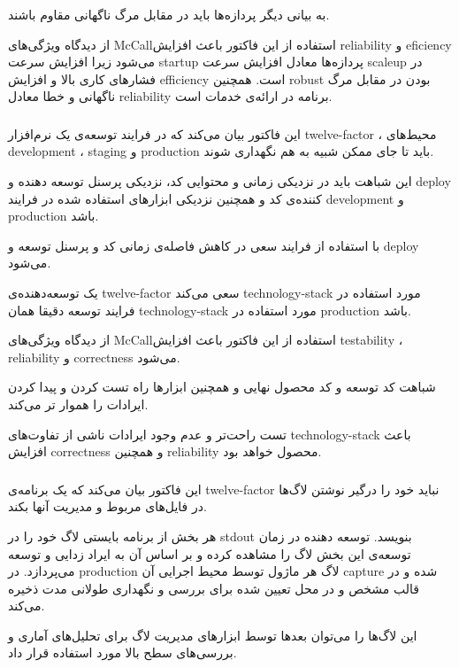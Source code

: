 به بیانی دیگر پردازه‌ها باید در مقابل مرگ ناگهانی مقاوم باشند.

از دیدگاه ویژگی‌های McCallاستفاده از این فاکتور باعث افزایش reliability و eficiency می‌شود زیرا افزایش سرعت startup پردازه‌ها معادل افزایش سرعت scaleup در فشار‌های کاری بالا و افزایش efficiency است. همچنین robust بودن در مقابل مرگ ناگهانی و خطا معادل reliability برنامه در ارائه‌ی خدمات است.

\subsubsection{}
این فاکتور بیان می‌کند که در فرایند توسعه‌ی یک نرم‌افزار 
twelve-factor
، محیط‌های development
،
staging
و 
production
باید تا جای ممکن شبیه به هم نگهداری شوند.

این شباهت باید در نزدیکی زمانی و محتوایی کد، نزدیکی پرسنل توسعه دهنده و deploy کننده‌ی کد و همچنین نزدیکی ابزار‌های استفاده شده در فرایند development و production باشد.

با استفاده از فرایند 
سعی در کاهش فاصله‌ی زمانی کد و پرسنل توسعه و deploy می‌شود.

یک توسعه‌دهنده‌ی  
twelve-factor
سعی می‌کند
technology-stack
مورد استفاده در فرایند توسعه دقیقا همان 
technology-stack
مورد استفاده در production باشد.

از دیدگاه ویژگی‌های McCallاستفاده از این فاکتور باعث افزایش
testability
،
reliability
و
correctness
می‌شود.

شباهت کد توسعه و کد محصول نهایی و همچنین ابزار‌ها راه تست کردن و پیدا کردن ایرادات را هموار تر می‌کند.

تست راحت‌تر و عدم وجود ایرادات ناشی از تفاوت‌های 
technology-stack
باعث افزایش
correctness و همچنین reliability محصول خواهد بود.


\subsubsection{}
این فاکتور بیان می‌کند که یک برنامه‌ی 
twelve-factor
نباید خود را درگیر نوشتن لاگ‌ها در فایل‌های مربوط و مدیریت آنها بکند.

هر بخش از برنامه بایستی لاگ خود را در stdout بنویسد. توسعه دهنده در زمان توسعه‌ی این بخش لاگ را مشاهده کرده و بر اساس آن به ایراد زدایی و توسعه می‌پردازد.
 در production  لاگ هر ماژول توسط محیط اجرایی آن capture شده و در قالب مشخص و در محل تعیین شده برای بررسی و نگهداری طولانی مدت ذخیره می‌کند.
 
 این لاگ‌ها را می‌توان بعد‌ها توسط ابزار‌های مدیریت لاگ برای تحلیل‌های آماری و بررسی‌های سطح بالا مورد استفاده قرار داد.
 

